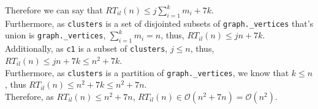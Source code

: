\documentclass[11pt]{article}
\newcommand{\cO}{\mathcal{O}}
\begin{document}
\begin{enumerate}
\begin{enumerate}
\begin{itemize}
\end{itemize}
Therefore we can say that $RT_{il}(n) \leq \displaystyle j\sum_{i = 1}^{k} m_i + 7k$.\\
Furthermore, as \texttt{clusters} is a set of disjointed subsets of \texttt{graph.\_vertices} that's union is \texttt{graph.\_vertices},
$\displaystyle \sum_{i = 1}^k m_i = n$, thus, $RT_{il}(n) \leq jn + 7k$.\\
Additionally, as \texttt{c1} is a subset of \texttt{clusters}, $j \leq n$, thus, $RT_{il}(n) \leq jn + 7k \leq n^2 + 7k$.\\
Furthermore, as \texttt{clusters} is a partition of \texttt{graph.\_vertices}, we know that $k \leq n$, 
thus $RT_{il}(n) \leq n^2 + 7k \leq n^2 + 7n$.\\
Therefore, as $RT_{il}(n) \leq n^2 + 7n$, $RT_{il}(n) \in \cO(n^2 + 7n) = \cO(n^2)$.



\end{enumerate}
\end{enumerate}
\end{document}
